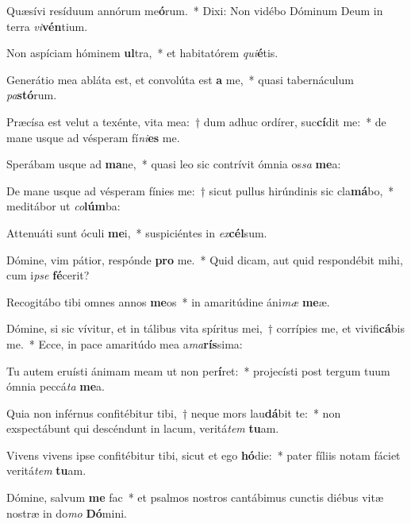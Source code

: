 \item Quæsívi resíduum annórum me\textbf{ó}rum.~* Dixi: Non vidébo Dóminum Deum in terra \textit{vi}\textbf{vén}tium.
\item Non aspíciam hóminem \textbf{ul}tra,~* et habitatórem \textit{qui}\textbf{é}tis.
\item Generátio mea abláta est, et convolúta est \textbf{a} me,~* quasi tabernáculum \textit{pa}\textbf{stó}rum.
\item Præcísa est velut a texénte, vita mea:~† dum adhuc ordírer, suc\textbf{cí}dit me:~* de mane usque ad vésperam fí\tinyhspace\textit{ni}\textbf{es} me.
\item Sperábam usque ad \textbf{ma}ne,~* quasi leo sic contrívit ómnia os\spurhspace\textit{sa} \textbf{me}a:
\item De mane usque ad vésperam fínies me:~† sicut pullus hirúndinis sic cla\textbf{má}bo,~* meditábor ut \textit{co}\textbf{lúm}ba:
\item Attenuáti sunt óculi \textbf{me}i,~* suspiciéntes in \textit{ex}\textbf{cél}sum.
\item Dómine, vim pátior, respónde \textbf{pro} me.~* Quid dicam, aut quid respondébit mihi, cum i\tinyhspace\textit{pse} \textbf{fé}cerit?
\item Recogitábo tibi omnes annos \textbf{me}os~* in amaritúdine áni\textit{mæ} \textbf{me}æ.
\item Dómine, si sic vívitur, et in tálibus vita spíritus mei,~† corrípies me, et vivifi\textbf{cá}bis me.~* Ecce, in pace amaritúdo mea a\textit{ma}\textbf{rís}sima:
\item Tu autem eruísti ánimam meam ut non per\textbf{í}ret:~* projecísti post tergum tuum ómnia peccá\spurhspace\textit{ta} \textbf{me}a.
\item Quia non inférnus confitébitur tibi,~† neque mors lau\textbf{dá}bit te:~* non exspectábunt qui descéndunt in lacum, veritá\tinyhspace\textit{tem} \textbf{tu}am.
\item Vivens vivens ipse confitébitur tibi, sicut et ego \textbf{hó}die:~* pater fíliis notam fáciet veritá\tinyhspace\textit{tem} \textbf{tu}am.
\item Dómine, salvum \textbf{me} fac~* et psalmos nostros cantábimus cun\-ctis diébus vitæ nostræ in do\textit{mo} \textbf{Dó}mini.
